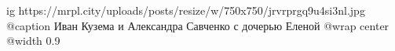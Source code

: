  
 
 
 
 

\ifcmt
  ig https://mrpl.city/uploads/posts/resize/w/750x750/jrvrprgq9u4si3nl.jpg
	@caption Иван Кузема и Александра Савченко с дочерью Еленой
  @wrap center
  @width 0.9
\fi

